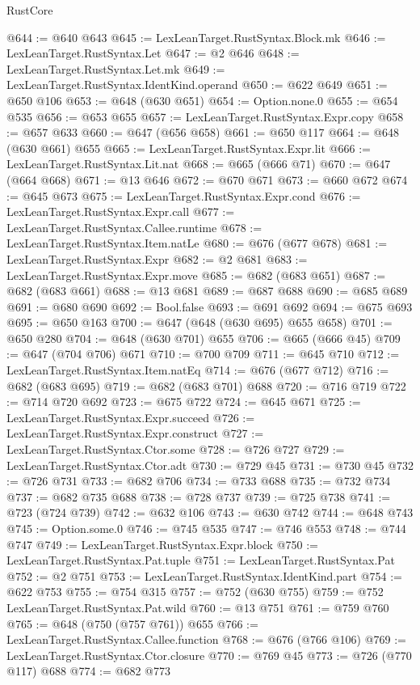 \begin{lexlean}{RustCore}
\begin{coremodule}
@644 := @640 @643
@645 := LexLeanTarget.RustSyntax.Block.mk
@646 := LexLeanTarget.RustSyntax.Let
@647 := @2 @646
@648 := LexLeanTarget.RustSyntax.Let.mk
@649 := LexLeanTarget.RustSyntax.IdentKind.operand
@650 := @622 @649
@651 := @650 @106
@653 := @648 (@630 @651)
@654 := Option.none.{0}
@655 := @654 @535
@656 := @653 @655
@657 := LexLeanTarget.RustSyntax.Expr.copy
@658 := @657 @633
@660 := @647 (@656 @658)
@661 := @650 @117
@664 := @648 (@630 @661) @655
@665 := LexLeanTarget.RustSyntax.Expr.lit
@666 := LexLeanTarget.RustSyntax.Lit.nat
@668 := @665 (@666 @71)
@670 := @647 (@664 @668)
@671 := @13 @646
@672 := @670 @671
@673 := @660 @672
@674 := @645 @673
@675 := LexLeanTarget.RustSyntax.Expr.cond
@676 := LexLeanTarget.RustSyntax.Expr.call
@677 := LexLeanTarget.RustSyntax.Callee.runtime
@678 := LexLeanTarget.RustSyntax.Item.natLe
@680 := @676 (@677 @678)
@681 := LexLeanTarget.RustSyntax.Expr
@682 := @2 @681
@683 := LexLeanTarget.RustSyntax.Expr.move
@685 := @682 (@683 @651)
@687 := @682 (@683 @661)
@688 := @13 @681
@689 := @687 @688
@690 := @685 @689
@691 := @680 @690
@692 := Bool.false
@693 := @691 @692
@694 := @675 @693
@695 := @650 @163
@700 := @647 (@648 (@630 @695) @655 @658)
@701 := @650 @280
@704 := @648 (@630 @701) @655
@706 := @665 (@666 @45)
@709 := @647 (@704 @706) @671
@710 := @700 @709
@711 := @645 @710
@712 := LexLeanTarget.RustSyntax.Item.natEq
@714 := @676 (@677 @712)
@716 := @682 (@683 @695)
@719 := @682 (@683 @701) @688
@720 := @716 @719
@722 := @714 @720 @692
@723 := @675 @722
@724 := @645 @671
@725 := LexLeanTarget.RustSyntax.Expr.succeed
@726 := LexLeanTarget.RustSyntax.Expr.construct
@727 := LexLeanTarget.RustSyntax.Ctor.some
@728 := @726 @727
@729 := LexLeanTarget.RustSyntax.Ctor.adt
@730 := @729 @45
@731 := @730 @45
@732 := @726 @731
@733 := @682 @706
@734 := @733 @688
@735 := @732 @734
@737 := @682 @735 @688
@738 := @728 @737
@739 := @725 @738
@741 := @723 (@724 @739)
@742 := @632 @106
@743 := @630 @742
@744 := @648 @743
@745 := Option.some.{0}
@746 := @745 @535
@747 := @746 @553
@748 := @744 @747
@749 := LexLeanTarget.RustSyntax.Expr.block
@750 := LexLeanTarget.RustSyntax.Pat.tuple
@751 := LexLeanTarget.RustSyntax.Pat
@752 := @2 @751
@753 := LexLeanTarget.RustSyntax.IdentKind.part
@754 := @622 @753
@755 := @754 @315
@757 := @752 (@630 @755)
@759 := @752 LexLeanTarget.RustSyntax.Pat.wild
@760 := @13 @751
@761 := @759 @760
@765 := @648 (@750 (@757 @761)) @655
@766 := LexLeanTarget.RustSyntax.Callee.function
@768 := @676 (@766 @106)
@769 := LexLeanTarget.RustSyntax.Ctor.closure
@770 := @769 @45
@773 := @726 (@770 @117) @688
@774 := @682 @773

\end{coremodule}
\end{lexlean}
